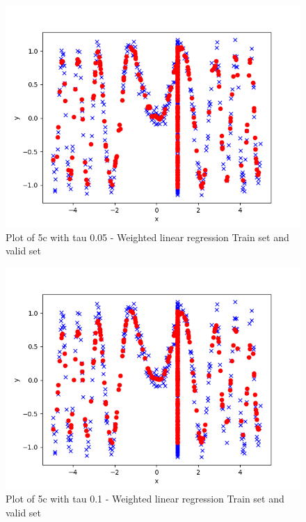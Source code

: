 \begin{answer}
\begin{figure}
  \includegraphics[width=\linewidth]{../src/output/p05c_plot_0_05_tau.png}
  \caption{Plot of 5c with tau 0.05 - Weighted linear regression Train set and valid set}
  \label{fig:Plot of 5c with tau 0.05 - Weighted linear regression Train set and valid set}
\end{figure}
\begin{figure}
  \includegraphics[width=\linewidth]{../src/output/p05c_plot_0_1_tau.png}
  \caption{Plot of 5c with tau 0.1 - Weighted linear regression Train set and valid set}
  \label{fig:Plot of 5c with tau 0.1 - Weighted linear regression Train set and valid set}
\end{figure}
\begin{figure}

\end{figure}
\end{answer}
